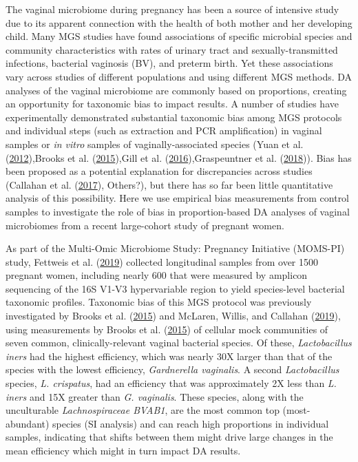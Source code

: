 \documentclass[
]{article}
\begin{document}
The vaginal microbiome during pregnancy has been a source of intensive study due to its apparent connection with the health of both mother and her developing child.
Many MGS studies have found associations of specific microbial species and community characteristics with rates of urinary tract and sexually-transmitted infections, bacterial vaginosis (BV), and preterm birth.
Yet these associations vary across studies of different populations and using different MGS methods.
DA analyses of the vaginal microbiome are commonly based on proportions, creating an opportunity for taxonomic bias to impact results.
A number of studies have experimentally demonstrated substantial taxonomic bias among MGS protocols and individual steps (such as extraction and PCR amplification) in vaginal samples or \emph{in vitro} samples of vaginally-associated species (Yuan et al. (\protect\hyperlink{ref-yuan2012eval}{2012}),Brooks et al. (\protect\hyperlink{ref-brooks2015thet}{2015}),Gill et al. (\protect\hyperlink{ref-gill2016eval}{2016}),Graspeuntner et al. (\protect\hyperlink{ref-graspeuntner2018sele}{2018})).
Bias has been proposed as a potential explanation for discrepancies across studies (Callahan et al. (\protect\hyperlink{ref-callahan2017repl}{2017}), Others?), but there has so far been little quantitative analysis of this possibility.
Here we use empirical bias measurements from control samples to investigate the role of bias in proportion-based DA analyses of vaginal microbiomes from a recent large-cohort study of pregnant women.

As part of the Multi-Omic Microbiome Study: Pregnancy Initiative (MOMS-PI) study, Fettweis et al. (\protect\hyperlink{ref-fettweis2019thev}{2019}) collected longitudinal samples from over 1500 pregnant women, including nearly 600 that were measured by amplicon sequencing of the 16S V1-V3 hypervariable region to yield species-level bacterial taxonomic profiles.
Taxonomic bias of this MGS protocol was previously investigated by Brooks et al. (\protect\hyperlink{ref-brooks2015thet}{2015}) and McLaren, Willis, and Callahan (\protect\hyperlink{ref-mclaren2019cons}{2019}), using measurements by Brooks et al. (\protect\hyperlink{ref-brooks2015thet}{2015}) of cellular mock communities of seven common, clinically-relevant vaginal bacterial species.
Of these, \emph{Lactobacillus iners} had the highest efficiency, which was nearly 30X larger than that of the species with the lowest efficiency, \emph{Gardnerella vaginalis}.
A second \emph{Lactobacillus} species, \emph{L. crispatus}, had an efficiency that was approximately 2X less than \emph{L. iners} and 15X greater than \emph{G. vaginalis}.
These species, along with the unculturable \emph{Lachnospiraceae BVAB1}, are the most common top (most-abundant) species (SI analysis) and can reach high proportions in individual samples, indicating that shifts between them might drive large changes in the mean efficiency which might in turn impact DA results.
\end{document}
